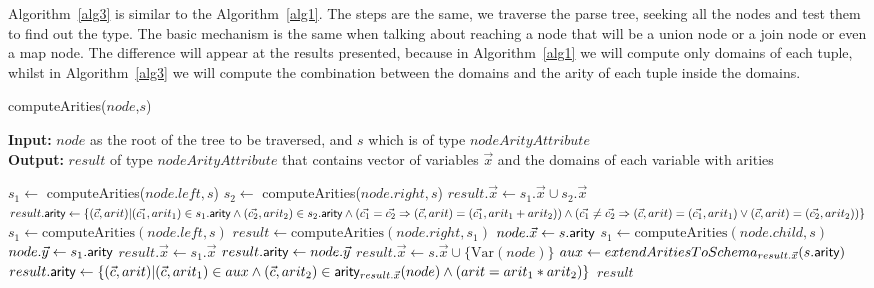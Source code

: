 \documentclass[12pt]{article}
\begin{document}
%
Algorithm~\ref{alg3} is similar to the Algorithm~\ref{alg1}. The steps are the same, we traverse the parse tree, seeking all the nodes and test them to find out the type. The basic mechanism is the same when talking about reaching a node that will be a union node or a join node or even a map node. The difference will appear at the results presented, because in  Algorithm~\ref{alg1} we will compute only domains of each tuple, whilst in Algorithm~\ref{alg3} we will compute the combination between the domains and the arity of each tuple inside the domains. 
\begin{algorithm}[H]
\caption{computeArities($node$,$s$)} 
\label{alg3}
\textbf{Input:} $node$ as the root of the tree to be traversed, and $s$ which is of type $nodeArityAttribute$ \\
\textbf{Output:}  $result$ of type $nodeArityAttribute$ that contains vector of variables $\vec x$ and the domains of each variable with arities
\begin{algorithmic}[1]
\STATE  $s_{1}\gets$ computeArities($node.left, s$)
\STATE  $s_{2}\gets$ computeArities($node.right, s$)
\STATE  $result.\vec{x}\gets s_{1}.\vec{x} \cup s_{2}.\vec{x}$
\STATE  $result.\textsf{arity}{}\gets \{(\vec{c},arit)|(\vec{c_{1}},arit_{1})\in s_{1}.\textsf{arity}{}\land (\vec{c_{2}},arit_{2})\in s_{2}.\textsf{arity}{}\land (\vec{c_{1}}=\vec{c_{2}}\Rightarrow (\vec{c},arit)=(\vec{c_{1}},arit_{1}+arit_{2}))\land (\vec{c_{1}}\not=\vec{c_{2}}\Rightarrow (\vec{c},arit)=(\vec{c_{1}},arit_{1})\lor (\vec{c},arit)=(\vec{c_{2}},arit_{2}) )\}$
\STATE  $s_{1} \gets \text{computeArities}(node.left, s)$
\STATE $result\gets \text{computeArities}(node.right, s_{1})$
\STATE $node.\vec{x}\gets s.\textsf{arity}{}$
\STATE $s_{1}\gets\text{computeArities}(node.child,s)$
\STATE $node.\vec{y}\gets s_{1}.\textsf{arity}{}$
\STATE $result.\vec{x}\gets s_{1}.\vec{x}$
\STATE $result.\textsf{arity}{}\gets node.\vec{y}$
\ELSE 
\STATE $result.\vec{x}\gets s.\vec{x} \cup \{\text{Var$(node)$}\}$
\STATE $aux \gets extendAritiesToSchema_{result.\vec{x}}(s.\textsf{arity}{})$
\STATE $result.\textsf{arity}{}\gets \{(\vec{c},arit)|(\vec{c},arit_{1})\in aux\land (\vec{c},arit_{2})\in \textsf{arity}{}_{result.\vec{x}}(node) \land (arit=arit_{1}*arit_{2}) \}$
\ENDIF
\RETURN $result$
\end{algorithmic}
\end{algorithm}
\end{document}
